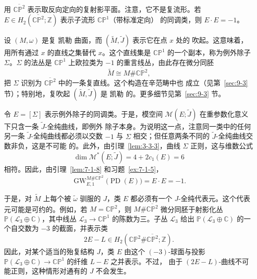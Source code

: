 \begin{example}[例外除子]\label{ex:7-1-15}
用 $\overline{\mathbb{CP}^2}$ 表示取反向定向的复射影平面。注意，它不是复流形。若
$E\in H_2(\overline{\mathbb{CP}^2};\mathbb Z)$ 表示子流形 $\mathbb{CP}^1$（带标准定向）
的同调类，则 $E\cdot E=-1$。

设 $(M,\omega)$ 是复 凯勒 曲面，而 $(\widetilde M,\widetilde J)$ 表示它在点 $x$ 处的
吹起。这意味着，用所有通过 $x$ 的直线之集替代 $x$。这个直线集是
$\mathbb{CP}^1$ 的一个副本，称为例外除子 $\Sigma$。$\Sigma$ 的法丛是
$\mathbb{CP}^1$ 上欧拉类为 $-1$ 的重言线丛，由此存在微分同胚
\[
  \widetilde M\cong M\#\overline{\mathbb{CP}^2},
\]
把 $\Sigma$ 识别为 $\overline{\mathbb{CP}^2}$ 中的一条复直线。这个构造在辛范畴中也
成立（见第~\ref{sec:9-3} 节）；特别地，复吹起 $(\widetilde M,\widetilde J)$ 是
凯勒 的。更多细节见第~\ref{sec:9-3} 节。

令 $E=[\Sigma]$ 表示例外除子的同调类。于是，模空间
$\mathcal M(E;\widetilde J)$ 在重参数化意义下只含一条 $\widetilde J$-全纯曲线，即例外
除子本身。为说明这一点，注意同一类中的任何另一条 $\widetilde J$-全纯曲线都必须以交数
$-1$ 与 $\Sigma$ 相交；但任意两条不同的 $\widetilde J$-全纯曲线交数非负，这是不可能
的。此外，由引理~\ref{lem:3-3-3}，曲线 $\Sigma$ 正则，这与维数公式
\[
  \dim\mathcal M^*(E;\widetilde J)=4+2c_1(E)=6
\]
相符。因此，由引理~\ref{lem:7-1-8} 和习题~\ref{ex:7-1-5}，
\[
  \operatorname{GW}^{M\#\overline{\mathbb{CP}^2}}_{E,1}
  \bigl(\operatorname{PD}(E)\bigr)=E\cdot E=-1.
\]

于是，对 $\widetilde M$ 上每个被 $\widetilde\omega$ 驯服的 $J$，类 $E$ 都必须有一个
$J$-全纯代表元。这个代表元可能是可约的。例如，若 $M=\mathbb{CP}^2$，则
$M\#\overline{\mathbb{CP}^2}$ 微分同胚于射影化丛
$\mathbb P(\mathcal L_3\oplus\mathbb C)$，其中线丛
$\mathcal L_3\to\mathbb{CP}^1$ 的陈数为三。子丛 $\mathcal L_3$ 给出
$\mathbb P(\mathcal L_3\oplus\mathbb C)$ 的一个自交数为 $-3$ 的截面，并表示类
\[
  2E-L\in H_2(\mathbb{CP}^2\#\overline{\mathbb{CP}^2};\mathbb Z).
\]
因此，对某个适当的殆复结构 $J$，类 $E$ 由这个 $(-3)$-球面与投影
$\mathbb P(\mathcal L_3\oplus\mathbb C)\to\mathbb{CP}^1$ 的纤维 $L-E$ 之并表示。不过，
由于 $(2E-L)$-曲线不可能正则，这种情形对通有的 $J$ 不会发生。
\end{example}

